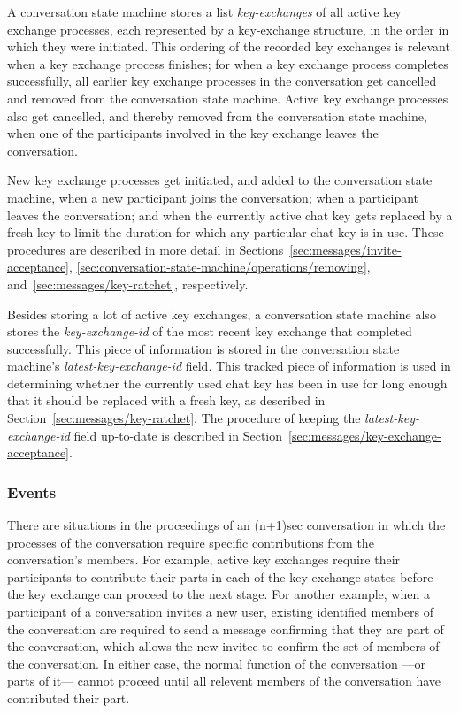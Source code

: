 \documentclass{article}
\def\smfield#1{\textsl{#1}}
\def\type#1{\textsf{#1}}
\begin{document}
A conversation state machine stores a list \smfield{key-exchanges} of all active key exchange processes, each represented by a \type{key-exchange} structure, in the order in which they were initiated.
This ordering of the recorded key exchanges is relevant when a key exchange process finishes; for when a key exchange process completes successfully, all earlier key exchange processes in the conversation get cancelled and removed from the conversation state machine.
Active key exchange processes also get cancelled, and thereby removed from the conversation state machine, when one of the participants involved in the key exchange leaves the conversation.

New key exchange processes get initiated, and added to the conversation state machine, when a new participant joins the conversation; when a participant leaves the conversation; and when the currently active chat key gets replaced by a fresh key to limit the duration for which any particular chat key is in use.
These procedures are described in more detail in Sections~\ref{sec:messages/invite-acceptance}, \ref{sec:conversation-state-machine/operations/removing}, and~\ref{sec:messages/key-ratchet}, respectively.

Besides storing a lot of active key exchanges, a conversation state machine also stores the \smfield{key-exchange-id} of the most recent key exchange that completed successfully.
This piece of information is stored in the conversation state machine's \smfield{latest-key-exchange-id} field.
This tracked piece of information is used in determining whether the currently used chat key has been in use for long enough that it should be replaced with a fresh key, as described in Section~\ref{sec:messages/key-ratchet}.
The procedure of keeping the \smfield{latest-key-exchange-id} field up-to-date is described in Section~\ref{sec:messages/key-exchange-acceptance}.


\subsubsection{Events}
\label{sec:conversation-state-machine/contents/events}

There are situations in the proceedings of an (n+1)sec conversation in which the processes of the conversation require specific contributions from the conversation's members.
For example, active key exchanges require their participants to contribute their parts in each of the key exchange states before the key exchange can proceed to the next stage.
For another example, when a participant of a conversation invites a new user, existing identified members of the conversation are required to send a message confirming that they are part of the conversation, which allows the new invitee to confirm the set of members of the conversation.
In either case, the normal function of the conversation ---or parts of it--- cannot proceed until all relevent members of the conversation have contributed their part.
\end{document}
